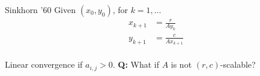 \documentclass{beamer}
\begin{document}
\begin{frame}
  \frametitle{}

  \begin{block}{Sinkhorn '60}
    Given $(x_0, y_0)$, for $k=1,\dots$
    \begin{equation}
      \begin{aligned}
        x_{k+1}&= \frac{r}{A y_k} \\
        y_{k+1}&= \frac{c}{A x_{k+1}} \\
      \end{aligned}
    \end{equation}
  \end{block}
  Linear convergence if $a_{i,j} > 0$.
  \textbf{Q:} What if $A$ is not $(r,c)$-scalable?
\end{frame}
\end{document}
